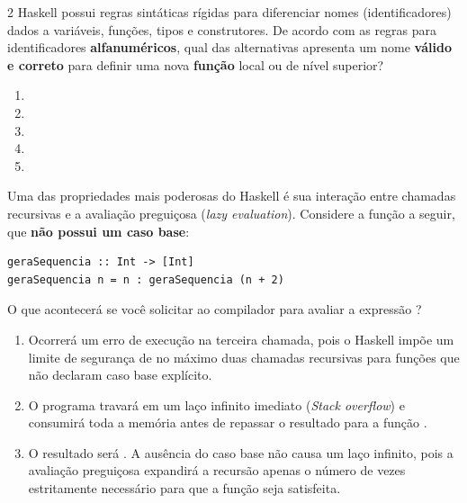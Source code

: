 \documentclass[a4paper,10pt,brazil]{article}
\begin{document}
\begin{multicols}{2}
Haskell possui regras sintáticas rígidas para diferenciar nomes (identificadores) dados a variáveis, funções, tipos e construtores. De acordo com as regras para identificadores \textbf{alfanuméricos}, qual das alternativas apresenta um nome \textbf{válido e correto} para definir uma nova \textbf{função} local ou de nível superior?

\begin{enumerate}
  \item {}

  \item {}

  \item {}

  \item {}
  \item {}


\end{enumerate}

Uma das propriedades mais poderosas do Haskell é sua interação entre chamadas recursivas e a avaliação preguiçosa (\emph{lazy evaluation}). Considere a função a seguir, que \textbf{não possui um caso base}:

\begin{verbatim}
geraSequencia :: Int -> [Int]
geraSequencia n = n : geraSequencia (n + 2)
\end{verbatim}

O que acontecerá se você solicitar ao compilador para avaliar a expressão ?

\begin{enumerate}
  \item Ocorrerá um erro de execução na terceira chamada, pois o Haskell impõe um limite de segurança de no máximo duas chamadas recursivas para funções que não declaram caso base explícito.
  \item O programa travará em um laço infinito imediato (\emph{Stack overflow}) e consumirá toda a memória antes de repassar o resultado para a função .

  \item O resultado será \haskellinline{[10, 12, 14]}. A ausência do caso base não causa um laço infinito, pois a avaliação preguiçosa expandirá a recursão apenas o número de vezes estritamente necessário para que a função  seja satisfeita.


\end{enumerate}
\end{multicols}
\end{document}
